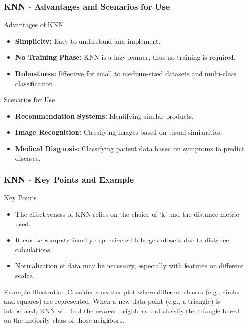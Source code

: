 \documentclass[aspectratio=169]{beamer}
\begin{document}
\begin{frame}[fragile]
    \frametitle{KNN - Advantages and Scenarios for Use}
    \begin{block}{Advantages of KNN}
        \begin{itemize}
            \item \textbf{Simplicity:} Easy to understand and implement.
            \item \textbf{No Training Phase:} KNN is a lazy learner, thus no training is required.
            \item \textbf{Robustness:} Effective for small to medium-sized datasets and multi-class classification.
        \end{itemize}
    \end{block}

    \begin{block}{Scenarios for Use}
        \begin{itemize}
            \item \textbf{Recommendation Systems:} Identifying similar products.
            \item \textbf{Image Recognition:} Classifying images based on visual similarities.
            \item \textbf{Medical Diagnosis:} Classifying patient data based on symptoms to predict diseases.
        \end{itemize}
    \end{block}
\end{frame}

\begin{frame}[fragile]
    \frametitle{KNN - Key Points and Example}
    \begin{block}{Key Points}
        \begin{itemize}
            \item The effectiveness of KNN relies on the choice of ‘k’ and the distance metric used.
            \item It can be computationally expensive with large datasets due to distance calculations.
            \item Normalization of data may be necessary, especially with features on different scales.
        \end{itemize}
    \end{block}

    \begin{block}{Example Illustration}
        Consider a scatter plot where different classes (e.g., circles and squares) are represented. When a new data point (e.g., a triangle) is introduced, KNN will find the nearest neighbors and classify the triangle based on the majority class of those neighbors.
    \end{block}
\end{frame}
\end{document}
